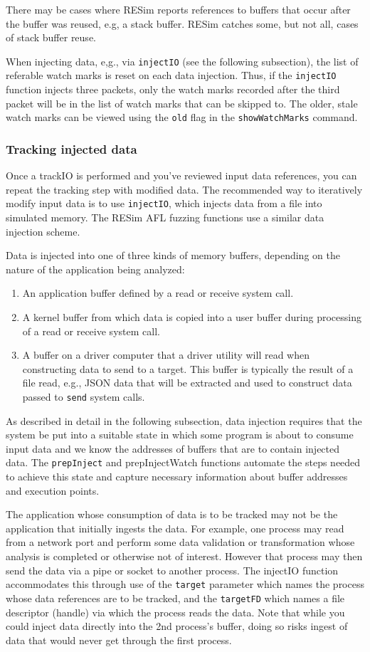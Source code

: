 \documentclass[titlepage]{article}
\begin{document}
There may be cases where RESim reports references to buffers that occur after the buffer was reused, e.g, a stack buffer.  RESim catches some, but not all,
cases of stack buffer reuse.

When injecting data, e,g., via {\tt injectIO} (see the following subsection), the list of referable watch marks is reset on each data injection.  Thus, if the {\tt injectIO} function injects
three packets, only the watch marks recorded after the third packet will be in the list of watch marks that can be skipped to.  The older, stale watch marks can
be viewed using the {\tt old} flag in the {\tt showWatchMarks} command.

\subsubsection{Tracking injected data}
Once a trackIO is performed and you've reviewed input data references, you can repeat the tracking step with modified data.
The recommended way to iteratively modify input data is to use  {\tt injectIO}, which injects data from a file into simulated memory.
The RESim AFL fuzzing functions use a similar data injection scheme.

Data is injected into one of three kinds of memory buffers, depending on the nature of the application being analyzed:
\begin{enumerate}
\item An application buffer defined by a read or receive system call.
\item A kernel buffer from which data is copied into a user buffer during processing of a read or receive system call.
\item A buffer on a driver computer that a driver utility will read when constructing data to send to a target.
This buffer is typically the result of a file read, e.g., JSON data that will be extracted and used to construct 
data passed to {\tt send} system calls.
\end{enumerate}
As described in detail in the following subsection, data injection requires that the system be put into a suitable
state in which some program is about to consume input data and we know the addresses of buffers that are to contain injected data.
The {\tt prepInject} and {prepInjectWatch} functions automate the steps needed to achieve this state and capture necessary information 
about buffer addresses and execution points.    

The application whose consumption of data is to be tracked may not be the application that initially ingests the data.  For example, one
process may read from a network port and perform some data validation or transformation whose analysis is completed or otherwise not of interest.
However that process may then send the data via a pipe or socket to another process.  The injectIO function accommodates this through use of
the {\tt target} parameter which names the process whose data references are to be tracked, and the {\tt targetFD} which names 
a file descriptor (handle) via which
the process reads the data.  Note that while you could inject data directly into the 2nd process's buffer, doing so risks ingest of data that
would never get through the first process.
\end{document}
